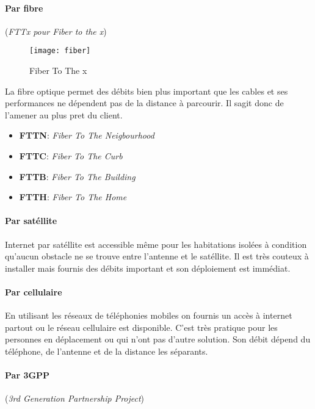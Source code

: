 \documentclass[10pt,a4paper]{article}
\begin{document}
 \paragraph{Par fibre} (\textit{FTTx pour Fiber to the x})\leavevmode

 \smallskip

 \begin{figure}[h]
	 \centering
	 \texttt{[image: fiber]}
	 \caption{Fiber To The x}
 \end{figure}

 La fibre optique permet des débits bien plus important que les cables et ses performances ne dépendent pas de la distance à parcourir. Il sagit donc de l'amener au plus pret du client.
 \begin{itemize}
	 \item \textbf{FTTN}: \textit{Fiber To The Neigbourhood}
	 \item \textbf{FTTC}: \textit{Fiber To The Curb}
	 \item \textbf{FTTB}: \textit{Fiber To The Building}
	 \item \textbf{FTTH}: \textit{Fiber To The Home}
 \end{itemize}


 \paragraph{Par satéllite}\leavevmode

 \smallskip

 Internet par satéllite est accessible même pour les habitations isolées à condition qu'aucun obstacle ne se trouve entre l'antenne et le satéllite. Il est très couteux à installer mais fournis des débits important et son déploiement est immédiat.




 \paragraph{Par cellulaire}\leavevmode

 \smallskip

 En utilisant les réseaux de téléphonies mobiles on fournis un accès à internet partout ou le réseau cellulaire est disponible. C'est très pratique pour les personnes en déplacement ou qui n'ont pas d'autre solution. Son débit dépend du téléphone, de l'antenne et de la distance les séparants.


 \paragraph{Par 3GPP} (\textit{3rd Generation Partnership Project})\leavevmode
\end{document}
